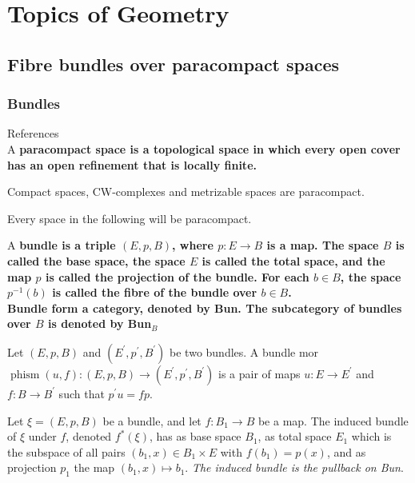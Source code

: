 \part{Topics of Geometry}


\chapter{Fibre bundles over paracompact spaces}

\section{Bundles}

References \cite{husemollerFibreBundles1994,mayConciseCourseAlgebraic1999}\\

A \bf{paracompact space} is a topological space in which every open cover has an open refinement that is locally finite. 

\begin{theo}
Compact spaces, CW-complexes and metrizable spaces are paracompact.
\end{theo}

Every space in the following will be paracompact.

A \bf{bundle} is a triple $(E, p, B)$, where $p: E \rightarrow B$ is a map. The space $B$ is called the \bf{base space}, the space $E$ is called the \bf{total space}, and the map $p$ is called the \bf{projection of the bundle}. For each $b \in B$, the space $p^{-1}(b)$ is called the \bf{fibre} of the bundle over $b \in B$.\\ Bundle form a category, denoted by Bun. The subcategory of bundles over $B$ is denoted by Bun$_B$

Let $(E, p, B)$ and $\left(E^{\prime}, p^{\prime}, B^{\prime}\right)$ be two bundles. A bundle mor$\operatorname{phism}(u, f):(E, p, B) \rightarrow\left(E^{\prime}, p^{\prime}, B^{\prime}\right)$ is a pair of maps $u: E \rightarrow E^{\prime}$ and $f: B \rightarrow B^{\prime}$ such that $p^{\prime} u=f p$.

Let $\xi=(E, p, B)$ be a bundle, and let $f: B_1 \rightarrow B$ be a map. The induced bundle of $\xi$ under $f$, denoted $f^*(\xi)$, has as base space $B_1$, as total space $E_1$ which is the subspace of all pairs $\left(b_1, x\right) \in B_1 \times E$ with $f\left(b_1\right)=p(x)$, and as projection $p_1$ the map $\left(b_1, x\right) \mapsto b_1$. \textit{The induced bundle is the pullback on Bun}.\\

